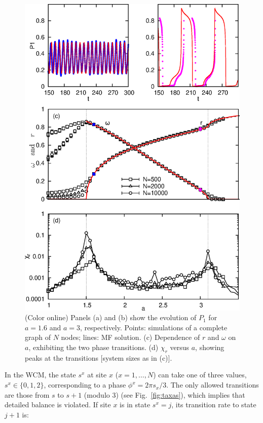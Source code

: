 \begin{figure}
    \includegraphics[height=.75\textheight]{fig/chap2/figure2.eps}
\begin{center}
\caption{\label{complete_graph} (Color online) Panels (a) and (b) show the evolution of $P_1$ for $a=1.6$ and $a=3$, respectively.
Points: simulations of a complete graph of $N$ nodes; lines: MF solution. (c) Dependence of $r$ and $\omega$ on $a$, exhibiting the two
phase transitions. (d) $\chi_r$ versus $a$, showing peaks at the transitions [system sizes as in (c)].  }
\end{center}
\end{figure}

In the WCM, the state $s^x$ at site $x$ ($x=1,\ldots,N$) can take one of three values, $s^x \in \{0,1,2\}$, corresponding to a phase
$\phi^x = 2 \pi s_x/3$.  The only allowed transitions are those from $s$ to $s+1$ (modulo 3) (see Fig.~\ref{fig:taxas}), which implies
that detailed balance is violated. If site $x$ is in state $s^x=j$, its transition rate to state $j+1$ is:

